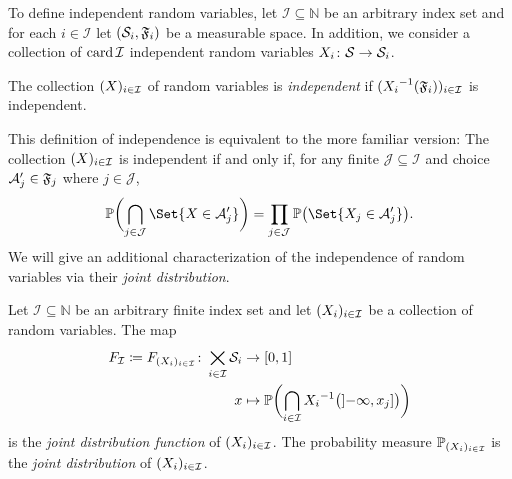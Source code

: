 To define independent random variables, let \( \mathcal{I} \subseteq \mathbb{N} \) be an arbitrary index set and for each \( i \in \mathcal{I} \) let \( (\mathcal{S}_i, \mathfrak{F}_i) \) be a measurable space.
In addition, we consider a collection of \( \operatorname{card} \mathcal{I} \) independent random variables \( X_i \colon \mathcal{S} \to \mathcal{S}_i \).
\begin{definition}%
	\label{def:independent random variables}
	The collection \( (X)_{i \in \mathcal{I}} \) of random variables is \emph{independent} if \( ({X_i}^{-1}(\mathfrak{F}_i))_{i \in \mathcal{I}} \) is independent.
\end{definition}
This definition of independence is equivalent to the more familiar version:
The collection \( (X)_{i \in \mathcal{I}} \) is independent if and only if, for any finite \( \mathcal{J} \subseteq \mathcal{I} \) and choice \( \mathcal{A}^\prime_j \in \mathfrak{F}_j \) where \( j \in \mathcal{J} \),
\begin{equation}
	\ProbabilityMeasure\biggl(\bigcap_{j\in\mathcal{J}} \Set{\RandomVariable \in \Event_j} \biggr) = \prod_{j\in\mathcal{J}} \ProbabilityMeasure\bigl(\Set{\RandomVariable_j \in \Event_j}\bigr).
\end{equation}
We will give an additional characterization of the independence of random variables via their \emph{joint distribution}.
\begin{definition}%
	\label{def:joint distribution}
	Let \( \mathcal{I} \subseteq \mathbb{N} \) be an arbitrary finite index set and let \( (X_i)_{i\in\mathcal{I}} \) be a collection of random variables.
	The map
	\begin{equation}
		\begin{aligned}
			\map{\DistributionFunction_{\mathcal{I}} \coloneqq \DistributionFunction_{(\RandomVariable_i)_{i\in\mathcal{I}}}}{\bigtimes_{i\in\mathcal{I}}\ASet_i&}{\interval{\num{0}}{\num{1}}}\\
			x&\mapsto \ProbabilityMeasure\biggl( \bigcap_{i\in\mathcal{I}}\PreImage{\RandomVariable_i}\bigl(\linterval{-\infty}{x_j}\bigr) \biggr)
		\end{aligned}
	\end{equation}
	is the \emph{joint distribution function} of \( (X_i)_{i\in\mathcal{I}} \).
	The probability measure \( \mathbb{P}_{(X_i)_{i\in\mathcal{I}}} \) is the \emph{joint distribution} of \( (X_i)_{i\in\mathcal{I}} \).
\end{definition}
